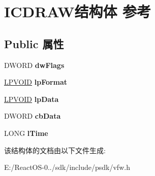 \hypertarget{struct_i_c_d_r_a_w}{}\section{I\+C\+D\+R\+A\+W结构体 参考}
\label{struct_i_c_d_r_a_w}
\subsection*{Public 属性}
\begin{DoxyCompactItemize}
\item 
\mbox{\label{struct_i_c_d_r_a_w_aec9cb793050a2ca686af3238661b8d41}} 
D\+W\+O\+RD {\bfseries dw\+Flags}
\item 
\mbox{\label{struct_i_c_d_r_a_w_a95c1505e24881bed90a34cf023cdfad9}} 
\hyperlink{interfacevoid}{L\+P\+V\+O\+ID} {\bfseries lp\+Format}
\item 
\mbox{\label{struct_i_c_d_r_a_w_a9516c17d2581d17c181c6ba62d4949fd}} 
\hyperlink{interfacevoid}{L\+P\+V\+O\+ID} {\bfseries lp\+Data}
\item 
\mbox{\label{struct_i_c_d_r_a_w_a686bbb890eaab313681201cd943bff5f}} 
D\+W\+O\+RD {\bfseries cb\+Data}
\item 
\mbox{\label{struct_i_c_d_r_a_w_a60fb80a0ca7b6d0bf588a70f92ef177f}} 
L\+O\+NG {\bfseries l\+Time}
\end{DoxyCompactItemize}


该结构体的文档由以下文件生成\+:\begin{DoxyCompactItemize}
\item 
E\+:/\+React\+O\+S-\/0../sdk/include/psdk/vfw.\+h\end{DoxyCompactItemize}
